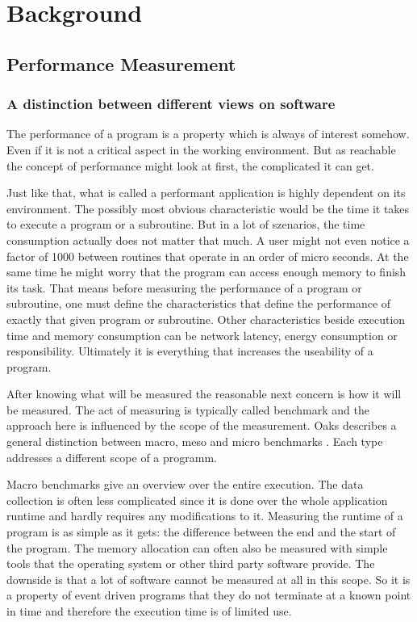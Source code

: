 \chapter{Background}

\section{Performance Measurement}
\label{benchmarking}
\subsection{A distinction between different views on software}
The performance of a program is a property which is always of interest somehow. Even if it is not a critical aspect in the working environment. But as reachable the concept of performance might look at first, the complicated it can get.

Just like that, what is called a performant application is highly dependent on its environment. The possibly most obvious characteristic would be the time it takes to execute a program or a subroutine. But in a lot of szenarios, the time consumption actually does not matter that much. A user might not even notice a factor of 1000 between routines that operate in an order of micro seconds. At the same time he might worry that the program can access enough memory to finish its task. That means before measuring the performance of a program or subroutine, one must define the characteristics that define the performance of exactly that given program or subroutine. Other characteristics beside execution time and memory consumption can be network latency, energy consumption or responsibility. Ultimately it is everything that increases the useability of a program.

After knowing what will be measured the reasonable next concern is how it will be measured. The act of measuring is typically called benchmark and the approach here is influenced by the scope of the measurement. Oaks describes a general distinction between macro, meso and micro benchmarks \cite{oaks2014java}. Each type addresses a different scope of a programm.%

Macro benchmarks give an overview over the entire execution. The data collection is often less complicated since it is done over the whole application runtime and hardly requires any modifications to it. Measuring the runtime of a program is as simple as it gets: the difference between the end and the start of the program. The memory allocation can often also be measured with simple tools that the operating system or other third party software provide. The downside is that a lot of software cannot be measured at all in this scope. So it is a property of event driven programs that they do not terminate at a known point in time and therefore the execution time is of limited use.

